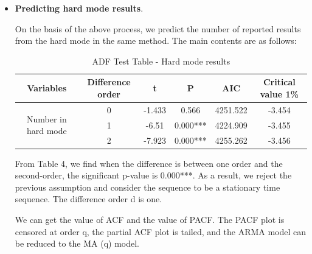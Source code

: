 \documentclass{mcmthesis}
\begin{document}
\begin{itemize}
Figure 5 offers the graph of the original data, fitted values and predictive values of the model. 

The figure illustrates the incredible similarity of the trend of the fitted sequence to the trend of the actual sequence, which represents a well-fitting result.
It is available for us to gain predictions of the two future months by using the above equations. Finally, we can conclude the prediction interval for the number of reported results on March 1, 2023.
\item {\bf Predicting hard mode results}.

On the basis of the above process, we predict the number of reported results from the hard mode in the same method. The main contents are as follows:
\begin{table}[H]  %
    \centering        %
    \caption{ADF Test Table - Hard mode results}  %
    \vspace{0.15cm}
    \renewcommand\arraystretch{1.2}
    \label{tab4}                       %
    \begin{tabular}{|c|c|c|c|c|c|}  %
    \hline                    %
    Variables & Difference order & t & P & AIC & Critical value 1\%   \\ \hline  %
    \multirow{3}{*}{Number in hard mode} & 0 & -1.433 & 0.566 & 4251.522 & -3.454\\ 
    & 1 & -6.51	& 0.000*** & 4224.909 & -3.455\\ 
    & 2 & -7.923 & 0.000*** & 4255.262 & -3.456\\ \hline 
    \end{tabular}
    \end{table}
                
    From Table 4, we find when the difference is between one order and the second-order, the significant p-value is 0.000***. As a result, we reject the previous assumption and consider the sequence to be a stationary time sequence. The difference order d is one.

    We can get the value of ACF and the value of PACF. The PACF plot is censored at order q, the partial ACF plot is tailed, and the ARMA model can be reduced to the MA (q) model.


\end{itemize}
\end{document}
